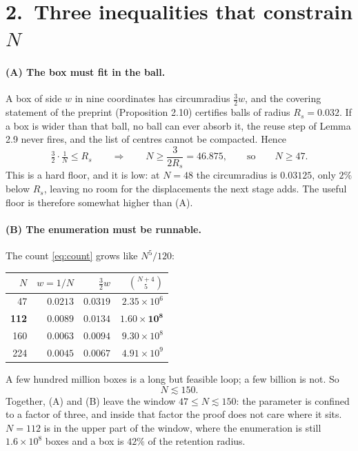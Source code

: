 \documentclass[11pt]{article}
\begin{document}
\section*{2.\ Three inequalities that constrain $N$}

\paragraph{(A) The box must fit in the ball.} A box of side $w$ in nine coordinates has circumradius
$\tfrac32 w$, and the covering statement of the preprint (Proposition 2.10) certifies balls of radius
$R_s=0.032$. If a box is wider than that ball, no ball can ever absorb it, the reuse step of Lemma
2.9 never fires, and the list of centres cannot be compacted. Hence
\[
\tfrac32\cdot\tfrac1N\le R_s
\qquad\Longrightarrow\qquad
N\ge \frac{3}{2R_s}=46.875 ,
\qquad\text{so}\qquad
N\ge 47 . \tag{A}
\]
This is a hard floor, and it is low: at $N=48$ the circumradius is $0.03125$, only $2\%$ below
$R_s$, leaving no room for the displacements the next stage adds. The useful floor is therefore
somewhat higher than (A).

\paragraph{(B) The enumeration must be runnable.} The count \eqref{eq:count} grows like $N^5/120$:

\begin{center}
\begin{tabular}{@{}rrrr@{}}
\toprule
$N$ & $w=1/N$ & $\tfrac32w$ & $\binom{N+4}{5}$ \\
\midrule
47  & $0.0213$ & $0.0319$ & $2.35\times10^{6}$\\
\textbf{112} & $\mathbf{0.0089}$ & $\mathbf{0.0134}$ & $\mathbf{1.60\times10^{8}}$\\
160 & $0.0063$ & $0.0094$ & $9.30\times10^{8}$\\
224 & $0.0045$ & $0.0067$ & $4.91\times10^{9}$\\
\bottomrule
\end{tabular}
\end{center}

\noindent
A few hundred million boxes is a long but feasible loop; a few billion is not. So
\[
N\lesssim150 . \tag{B}
\]
Together, (A) and (B) leave the window $47\le N\lesssim150$: the parameter is confined to a factor of
three, and inside that factor the proof does not care where it sits. $N=112$ is in the upper part of
the window, where the enumeration is still $1.6\times10^{8}$ boxes and a box is $42\%$ of the
retention radius.
\end{document}

